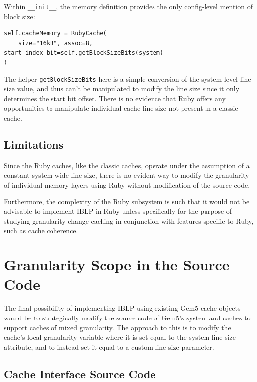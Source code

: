 \documentclass[12pt,twoside]{reedthesis}
\begin{document}
	Within \verb`__init__`, the memory definition provides the only config-level mention of block size: \begin{verbatim}
self.cacheMemory = RubyCache(
    size="16kB", assoc=8, start_index_bit=self.getBlockSizeBits(system)
)\end{verbatim}

	The helper \verb`getBlockSizeBits` here is a simple conversion of the system-level line size value, and thus can't be manipulated to modify the line size since it only determines the start bit offset. There is no evidence that Ruby offers any opportunities to manipulate individual-cache line size not present in a classic cache.

	\subsection*{Limitations}

	Since the Ruby caches, like the classic caches, operate under the assumption of a constant system-wide line size, there is no evident way to modify the granularity of individual memory layers using Ruby without modification of the source code.

	Furthermore, the complexity of the Ruby subsystem is such that it would not be advisable to implement IBLP in Ruby unless specifically for the purpose of studying granularity-change caching in conjunction with features specific to Ruby, such as cache coherence.

\section{Granularity Scope in the Source Code}

	The final possibility of implementing IBLP using existing Gem5 cache objects would be to strategically modify the source code of Gem5's system and caches to support caches of mixed granularity. The approach to this is to modify the cache's local granularity variable where it is set equal to the system line size attribute, and to instead set it equal to a custom line size parameter.

	\subsection*{Cache Interface Source Code}
\end{document}
